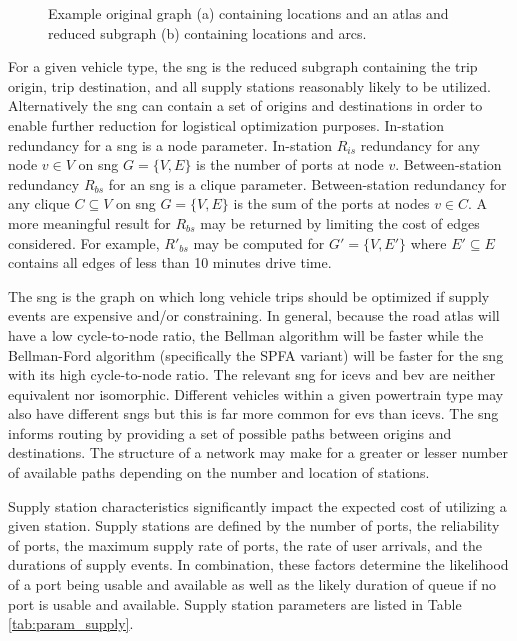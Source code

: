 \documentclass[11pt]{article}
\begin{document}
\begin{multicols}{2}
\begin{figure}[H]
\begin{subfigure}[t]{.5\linewidth}
	\end{subfigure}
	\caption{Example original graph (a) containing locations and an atlas and reduced subgraph (b) containing locations and arcs.}
	\label{fig:reduced_subgraph}
\end{figure}

For a given vehicle type, the \gls{sng} is the reduced subgraph containing the trip origin, trip destination, and all supply stations reasonably likely to be utilized. Alternatively the \gls{sng} can contain a set of origins and destinations in order to enable further reduction for logistical optimization purposes. In-station redundancy for a \gls{sng} is a node parameter. In-station $R_{is}$ redundancy for any node $v \in V$ on \gls{sng} $G = \{V, E\}$ is the number of ports at node $v$. Between-station redundancy $R_{bs}$ for an \gls{sng} is a clique parameter. Between-station redundancy for any clique $C \subseteq V$ on \gls{sng} $G = \{V, E\}$ is the sum of the ports at nodes $v \in C$. A more meaningful result for $R_{bs}$ may be returned by limiting the cost of edges considered. For example, $R'_{bs}$ may be computed for $G' = \{V, E'\}$ where $E' \subseteq E$ contains all edges of less than 10 minutes drive time.

The \gls{sng} is the graph on which long vehicle trips should be optimized if supply events are expensive and/or constraining. In general, because the road atlas will have a low cycle-to-node ratio, the Bellman algorithm will be faster while the Bellman-Ford algorithm (specifically the SPFA variant) will be faster for the \gls{sng} with its high cycle-to-node ratio. The relevant \gls{sng} for \glspl{icev} and \gls{bev} are neither equivalent nor isomorphic. Different vehicles within a given powertrain type may also have different \glspl{sng} but this is far more common for \glspl{ev} than \glspl{icev}. The \gls{sng} informs routing by providing a set of possible paths between origins and destinations. The structure of a network may make for a greater or lesser number of available paths depending on the number and location of stations.

Supply station characteristics significantly impact the expected cost of utilizing a given station. Supply stations are defined by the number of ports, the reliability of ports, the maximum supply rate of ports, the rate of user arrivals, and the durations of supply events. In combination, these factors determine the likelihood of a port being usable and available as well as the likely duration of queue if no port is usable and available. Supply station parameters are listed in Table \ref{tab:param_supply}.


\end{multicols}
\end{document}
